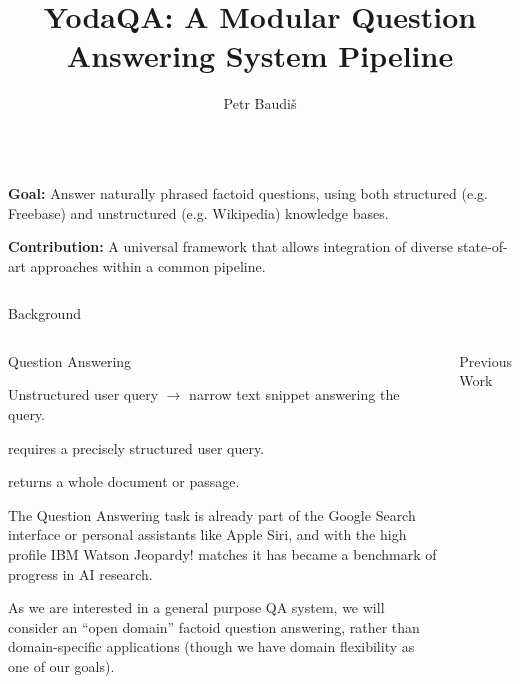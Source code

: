 \documentclass[xcolor=table]{beamer}
\title{YodaQA: A Modular Question Answering System Pipeline}
\author[baudipet@fel.cvut.cz]{Petr Baudiš}
\institute{Department of Cybernetics, Czech Technical University, Prague}
\begin{document}
\begin{frame}[fragile]{}

  \begin{columns}[t]
  \begin{multicols}{2}
    \large
    \justifying
    \setlength{\fboxsep}{15pt}%
%
    \colorbox{yellow!20!white}{\parbox{.96\columnwidth}{%
    \alert{\bfseries\sffamily Goal:} Answer naturally phrased factoid questions,
    using both structured (e.g. Freebase) and unstructured (e.g. Wikipedia)
    knowledge bases.
    }}

    \columnbreak

    \colorbox{green!15!white}{\parbox{.96\columnwidth}{%
    \alert{\bfseries\sffamily Contribution:} A universal framework that
    allows integration of diverse state-of-art approaches within a common pipeline.
    }}
  \end{multicols}
  \vspace{2ex}
  \end{columns}

  \begin{columns}[t]

    \begin{block}{Background}

      \begin{columns}[t]
	\begin{block}{Question Answering}
	\setlength{\parskip}{0.5ex}

		Unstructured user query $\to$ narrow text snippet answering the query.

		 requires a precisely structured user query.

		 returns a whole document or passage.

The Question Answering task is already part of the \alert{Google Search}
interface
or personal assistants like \alert{Apple Siri}, and with the high
profile \alert{IBM Watson} Jeopardy! matches
it has became a benchmark of progress in AI research.

As we are interested in a general purpose QA system, we will consider
an \alert{``open domain'' factoid} question answering, rather than
domain-specific applications (though we have domain flexibility as
one of our goals).
	\end{block}

	\begin{block}{Previous Work}
	\setlength{\parskip}{0.9ex}


\end{block}
\end{columns}
\end{block}
\end{columns}
\end{frame}
\end{document}

